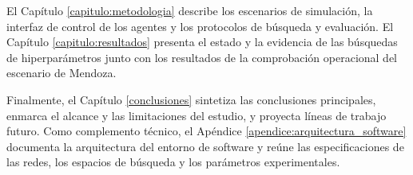 El Capítulo \ref{capitulo:metodologia} describe los escenarios de simulación, la interfaz de control de los agentes y los protocolos de búsqueda y evaluación. El Capítulo \ref{capitulo:resultados} presenta el estado y la evidencia de las búsquedas de hiperparámetros junto con los resultados de la comprobación operacional del escenario de Mendoza.

Finalmente, el Capítulo \ref{conclusiones} sintetiza las conclusiones principales, enmarca el alcance y las limitaciones del estudio, y proyecta líneas de trabajo futuro. Como complemento técnico, el Apéndice \ref{apendice:arquitectura_software} documenta la arquitectura del entorno de software y reúne las especificaciones de las redes, los espacios de búsqueda y los parámetros experimentales.
